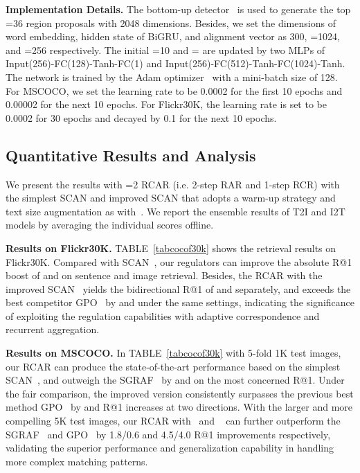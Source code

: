 \documentclass[journal]{IEEEtran}\newcommand{\ignore}[1]{}
\begin{document}
\textbf{Implementation Details.}
The bottom-up detector~\cite{BU_TDA} is used to generate the top =36 region proposals with 2048 dimensions. Besides, we set the dimensions of word embedding, hidden state of BiGRU, and alignment vector as 300, =1024, and =256 respectively. The initial =10 and = are updated by two MLPs of Input(256)-FC(128)-Tanh-FC(1) and Input(256)-FC(512)-Tanh-FC(1024)-Tanh.
The network is trained by the Adam optimizer~\cite{Adam} with a mini-batch size of 128. For MSCOCO, we set the learning rate to be 0.0002 for the first 10 epochs and 0.00002 for the next 10 epochs. For Flickr30K, the learning rate is set to be 0.0002 for 30 epochs and decayed by 0.1 for the next 10 epochs. 

\subsection{Quantitative Results and Analysis}
We present the results with =2 RCAR (i.e. 2-step RAR and 1-step RCR) with the simplest SCAN and improved SCAN that adopts a warm-up strategy and text size augmentation as with~\cite{GPO}. We report the ensemble results of T2I and I2T models by averaging the individual scores offline.

\textbf{Results on Flickr30K.} 
TABLE~\ref{tabcocof30k} shows the retrieval results on Flickr30K. Compared with SCAN~\cite{SCAN}, our regulators can improve the absolute R@1 boost of  and  on sentence and image retrieval. Besides, the RCAR with the improved SCAN~\cite{SCAN} yields the bidirectional R@1 of  and  separately, and exceeds the best competitor GPO~\cite{GPO} by  and  under the same settings, indicating the significance of exploiting the regulation capabilities with adaptive correspondence and recurrent aggregation.

\textbf{Results on MSCOCO.} 
In TABLE~\ref{tabcocof30k} with 5-fold 1K test images, our RCAR can produce the state-of-the-art performance based on the simplest SCAN~\cite{SCAN}, and outweigh the SGRAF~\cite{SGRAF} by  and  on the most concerned R@1. Under the fair comparison, the improved version consistently surpasses the previous best method GPO~\cite{GPO} by  and  R@1 increases at two directions.
With the larger and more compelling 5K test images, our RCAR with~\cite{SCAN} and ~\cite{SCAN} can further outperform the SGRAF~\cite{SGRAF} and GPO~\cite{GPO} by 1.8/0.6 and 4.5/4.0 R@1 improvements respectively, validating the superior performance and generalization capability in handling more complex matching patterns. 
\end{document}

